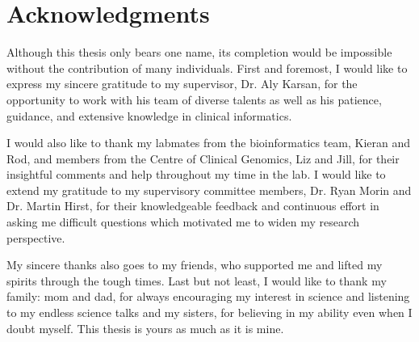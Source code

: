 
\chapter{Acknowledgments}

Although this thesis only bears one name, its completion would be impossible without the contribution of many individuals. First and foremost, I would like to express my sincere gratitude to my supervisor, Dr. Aly Karsan, for the opportunity to work with his team of diverse talents as well as his patience, guidance, and extensive knowledge in clinical informatics.

I would also like to thank my labmates from the bioinformatics team, Kieran and Rod, and members from the Centre of Clinical Genomics, Liz and Jill, for their insightful comments and help throughout my time in the lab. I would like to extend my gratitude to my supervisory committee members, Dr. Ryan Morin and Dr. Martin Hirst, for their knowledgeable feedback and continuous effort in asking me difficult questions which motivated me to widen my research perspective.

My sincere thanks also goes to my friends, who supported me and lifted my spirits through the tough times. Last but not least, I would like to thank my family: mom and dad, for always encouraging my interest in science and listening to my endless science talks and my sisters, for believing in my ability even when I doubt myself. This thesis is yours as much as it is mine.
